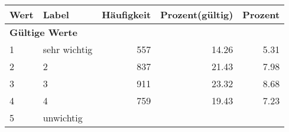      \begin{longtable}{lXrrr}
     \toprule
     \textbf{Wert} & \textbf{Label} & \textbf{Häufigkeit} & \textbf{Prozent(gültig)} & \textbf{Prozent} \\
     \endhead
     \midrule
     \multicolumn{5}{l}{\textbf{Gültige Werte}}\\

     1 &
     \multicolumn{1}{X}{ sehr wichtig   } &


       \num{557} &
       \num[round-mode=places,round-precision=2]{14.26} &
         \num[round-mode=places,round-precision=2]{5.31} \\

     2 &
     \multicolumn{1}{X}{ 2   } &


       \num{837} &
       \num[round-mode=places,round-precision=2]{21.43} &
         \num[round-mode=places,round-precision=2]{7.98} \\

     3 &
     \multicolumn{1}{X}{ 3   } &


       \num{911} &
       \num[round-mode=places,round-precision=2]{23.32} &
         \num[round-mode=places,round-precision=2]{8.68} \\

     4 &
     \multicolumn{1}{X}{ 4   } &


       \num{759} &
       \num[round-mode=places,round-precision=2]{19.43} &
         \num[round-mode=places,round-precision=2]{7.23} \\

     5 &
     \multicolumn{1}{X}{ unwichtig   } &



\end{longtable}
